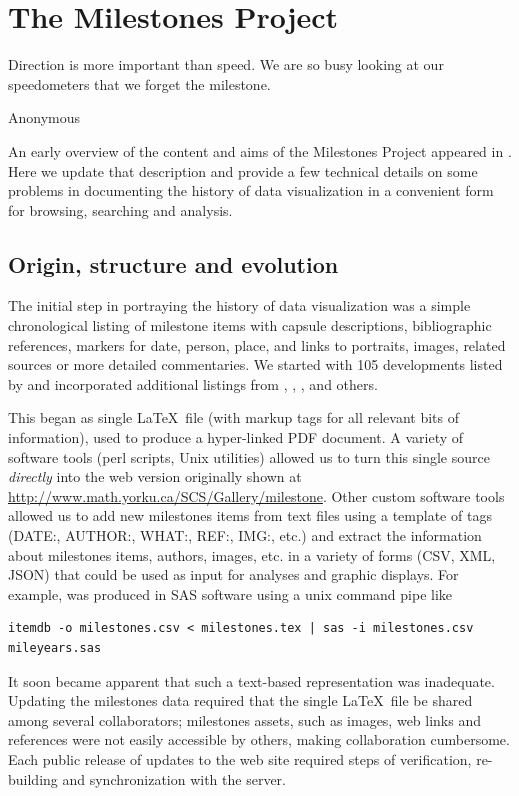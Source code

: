 \section{The Milestones Project}\label{sec:project}
\epigraph{Direction is more important than speed. We are so busy looking at our speedometers that we forget the milestone.}{Anonymous}

An early overview of the content and aims of the Milestones Project appeared in \cite{Friendly:04:gfkl}.
Here we update that description and provide a few technical details on some problems in
documenting the history of data visualization in a convenient form for browsing, searching and
analysis.

\subsection{Origin, structure and evolution}\label{sec:structure}
The initial step in portraying the history of data visualization was a simple chronological listing of milestone items
with capsule descriptions, bibliographic references, markers for date, person, place, and links to portraits, images,
related sources or more detailed commentaries.
We started with 105
developments listed by \citet{BenigerRobyn:1978}
and incorporated additional listings from
\citet{Hankins:1999},  \citet{Tufte:1983,Tufte:1990,Tufte:1997},  \citet{Heiser:2000}, and others.

This began as single \LaTeX\ file (with markup tags for all relevant bits of information),
used to produce a
hyper-linked PDF document.  A variety of software tools (perl scripts, Unix utilities) allowed us to turn this
single source
\emph{directly} into the web version originally shown at
\url{http://www.math.yorku.ca/SCS/Gallery/milestone}.  Other custom software tools allowed us to
add new milestones items from text files using a template of tags (DATE:, AUTHOR:, WHAT:, REF:, IMG:, etc.)
and extract the
information about milestones items, authors, images, etc. in a variety of forms (CSV, XML, JSON)
that could be used as input for analyses and graphic displays.  For example, 
was produced in SAS software using a unix command pipe like
\begin{verbatim}
itemdb -o milestones.csv < milestones.tex | sas -i milestones.csv mileyears.sas
\end{verbatim}

It soon became apparent that such a text-based representation was inadequate. Updating the milestones data 
required that the single \LaTeX\ file be shared among several collaborators; milestones 
assets, such as images, web links and references were not easily accessible by others, making collaboration cumbersome. 
Each public release of updates to the web site required steps of verification, re-building and
synchronization with the server.

